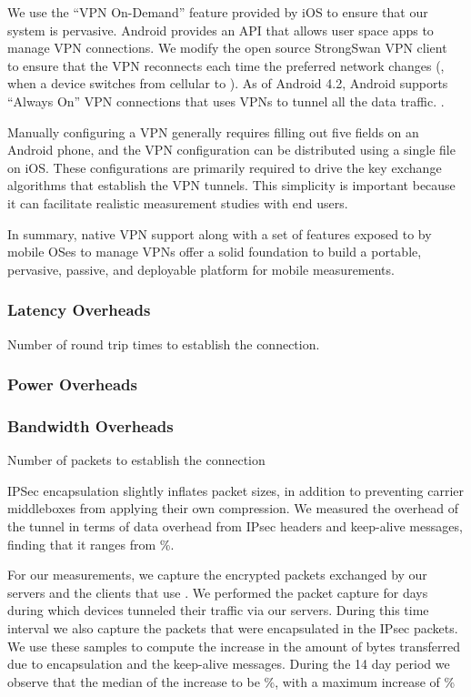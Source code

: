 We use the ``VPN On-Demand'' feature provided by iOS to ensure that our system is pervasive. 
Android provides an API that allows user space apps to manage VPN connections. 
We modify the open source StrongSwan VPN client~\cite{strongswanclient} to ensure that the VPN reconnects each time the preferred network changes (\eg, when a device switches from cellular to \wifi). 
As of Android 4.2, Android supports ``Always On'' VPN connections that uses VPNs to tunnel all the data traffic. 
.

Manually configuring a VPN generally requires filling out five fields on an Android phone, and the VPN configuration can be distributed using a single file on iOS.
These configurations are primarily required to drive the key exchange algorithms that establish the VPN tunnels. 
This simplicity is important because it can facilitate realistic measurement studies with end users.  

In summary, native VPN support along with a set of features exposed to by mobile OSes to manage VPNs offer a solid foundation to build a portable, pervasive, passive, and deployable platform for mobile measurements.

\subsubsection{Latency Overheads}
Number of round trip times to establish the connection. 

\subsubsection{Power Overheads}

\subsubsection{Bandwidth Overheads} 

Number of packets to establish the connection 

IPSec encapsulation slightly inflates packet sizes, in addition to preventing carrier middleboxes from applying their own compression. 
We measured the overhead of the tunnel in terms of data overhead from IPsec headers and keep-alive messages, finding that it ranges from \%.

For our measurements, we capture the encrypted packets exchanged by our servers and the clients that use \platname. 
We performed the packet capture for  days during which  devices tunneled their traffic via our  servers. 
During this time interval we also capture the packets that were encapsulated in the IPsec packets. 
We use these samples to compute the increase in the amount of bytes transferred due to encapsulation and the keep-alive messages. 
During the 14 day period we observe that the median of the increase to be \%, with a maximum increase of \%

